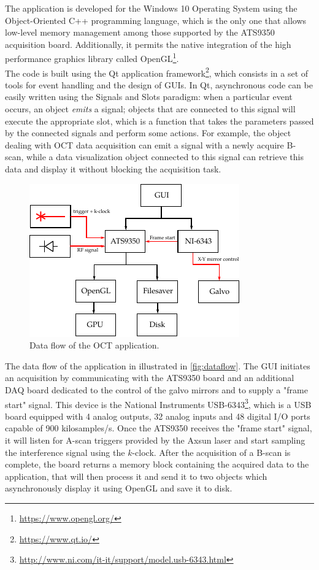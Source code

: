 
\noindent The application is developed for the Windows 10 Operating System using the Object-Oriented C++ programming language, which is the only one that allows low-level memory management among those supported by the ATS9350 acquisition board. Additionally, it permits the native integration of the high performance graphics library called OpenGL\footnote{\url{https://www.opengl.org/}}. \\


The code is built using the Qt application framework\footnote{\url{https://www.qt.io/}}, which consists in a set of tools for event handling and the design of \acp{GUI}. In Qt, asynchronous code can be easily written using the Signals and Slots paradigm: when a particular event occurs, an object \emph{emits} a signal; objects that are connected to this signal will execute the appropriate slot, which is a function that takes the parameters passed by the connected signals and perform some actions. For example, the object dealing with OCT data acquisition can emit a signal with a newly acquire B-scan, while a data visualization object connected to this signal can retrieve this data and display it without blocking the acquisition task. 

\begin{figure}[htb]
	\myfloatalign
	\includegraphics[width=0.6\linewidth]{gfx/ch4/dataflow}
	\caption{Data flow of the OCT application.}\label{fig:dataflow}
\end{figure}

The data flow of the application in illustrated in \autoref{fig:dataflow}. The \ac{GUI} initiates an acquisition by communicating with the ATS9350 board and an additional \ac{DAQ} board dedicated to the control of the galvo mirrors and to supply a "frame start" signal. This device is the National Instruments USB-6343\footnote{\url{http://www.ni.com/it-it/support/model.usb-6343.html}}, which is a USB board equipped with 4 analog outputs, 32 analog inputs and 48 digital I/O ports capable of 900 kilosamples/s. Once the ATS9350 receives the "frame start" signal, it will listen for A-scan triggers provided by the Axsun laser and start sampling the interference signal using the $k$-clock. After the acquisition of a B-scan is complete, the board returns a memory block containing the acquired data to the application, that will then process it and send it to two objects which asynchronously display it using OpenGL and save it to disk. 

